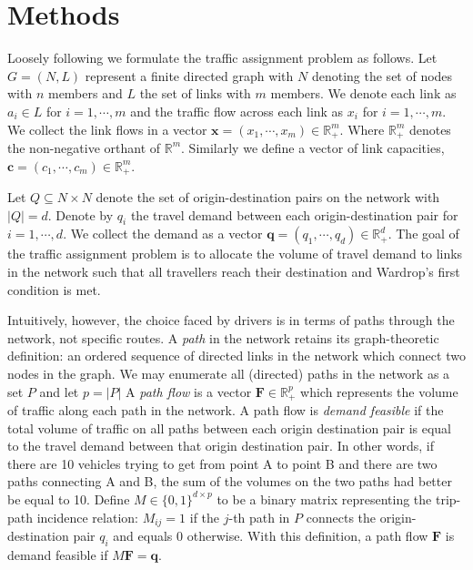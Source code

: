 \section{Methods}

Loosely following \citet{smith1979existence} we formulate the traffic assignment problem as follows.
Let $G=(N,L)$ represent a finite directed graph with $N$ denoting the set of nodes with $n$ members and $L$ the set of links with $m$ members.
We denote each link as $a_i\in L$ for $i=1,\cdots,m$ and the traffic flow across each link as $x_i$ for $i=1,\cdots,m$.
We collect the link flows in a vector $\mathbf{x}=(x_1,\cdots, x_m)\in\mathbb{R}_+^m$. 
Where $\mathbb{R}_+^m$ denotes the non-negative orthant of $\mathbb{R}^m$.
Similarly we define a vector of link capacities, $\mathbf{c}=(c_1, \cdots, c_m)\in \mathbb{R}_+^m$.

Let $Q\subseteq N\times N$ denote the set of origin-destination pairs on the network with $|Q| = d$.
Denote by $q_i$ the travel demand between each origin-destination pair for $i=1,\cdots,d$.
We collect the demand as a vector $\mathbf{q}=(q_1, \cdots, q_d)\in\mathbb{R}_+^d$. 
The goal of the traffic assignment problem is to allocate the volume of travel demand to links in the network such that all travellers reach their destination and Wardrop's first condition is met.

Intuitively, however, the choice faced by drivers is in terms of paths through the network, not specific routes.
A \textit{path} in the network retains its graph-theoretic definition: an ordered sequence of directed links in the network which connect two nodes in the graph. 
We may enumerate all (directed) paths in the network as a set $P$ and let $p=|P|$
A \textit{path flow} is a vector $\mathbf{F}\in \mathbb{R}^p_+$ which represents the volume of traffic along each path in the network.
A path flow is \textit{demand feasible} if the total volume of traffic on all paths between each origin destination pair is equal to the travel demand between that origin destination pair.
In other words, if there are 10 vehicles trying to get from point A to point B and there are two paths connecting A and B, the sum of the volumes on the two paths had better be equal to 10.
Define $M \in \{0, 1\}^{d\times p}$ to be a binary matrix representing the trip-path incidence relation: $M_{ij} = 1$ if the $j$-th path in $P$ connects the origin-destination pair $q_i$ and equals $0$ otherwise.
With this definition, a path flow $\mathbf{F}$ is demand feasible if $M\mathbf{F}=\mathbf{q}$.

